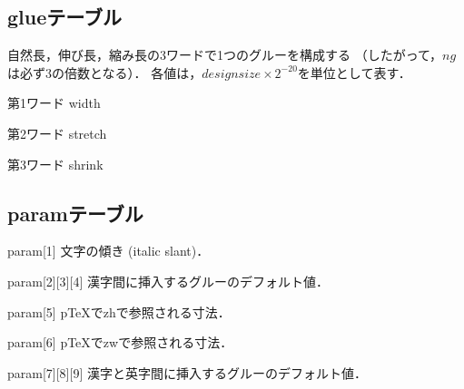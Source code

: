 \documentclass[a4paper,11pt,nomag]{jsarticle}
\begin{document}
\subsection{glueテーブル}
自然長，伸び長，縮み長の3ワードで1つのグルーを構成する
（したがって，$ng$は必ず3の倍数となる）．
各値は，$design size\times2^{-20}$を単位として表す．
\begin{description}
\item{第1ワード} width
\item{第2ワード} stretch
\item{第3ワード} shrink
\end{description}
%
\subsection{paramテーブル}
\begin{description}
\item{param[1]} 文字の傾き (italic slant)．
\item{param[2][3][4]} 漢字間に挿入するグルーのデフォルト値．
\item{param[5]} p\TeX{}でzhで参照される寸法．
\item{param[6]} p\TeX{}でzwで参照される寸法．
\item{param[7][8][9]} 漢字と英字間に挿入するグルーのデフォルト値．
\end{description}
%
\newpage
\end{document}
